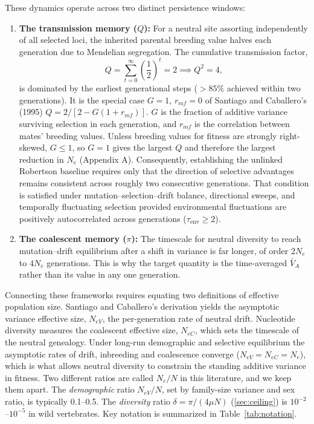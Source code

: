 \documentclass[12pt]{article}
\begin{document}
These dynamics operate across two distinct persistence windows:
\begin{enumerate}
    \item \textbf{The transmission memory ($Q$):} For a neutral site assorting independently of all selected loci, the inherited parental breeding value halves each generation due to Mendelian segregation. The cumulative transmission factor,
    \begin{equation}
    Q = \sum_{t=0}^{\infty} \left(\frac{1}{2}\right)^t = 2 \implies Q^2 = 4,
    \end{equation}
    is dominated by the earliest generational steps ($>85\%$ achieved within two generations). It is the special case $G = 1$, $r_{mf} = 0$ of Santiago and Caballero's (1995) $Q = 2/[2 - G(1+r_{mf})]$. $G$ is the fraction of additive variance surviving selection in each generation, and $r_{mf}$ is the correlation between mates' breeding values. Unless breeding values for fitness are strongly right-skewed, $G \le 1$, so $G = 1$ gives the largest $Q$ and therefore the largest reduction in $N_e$ (Appendix A). Consequently, establishing the unlinked Robertson baseline requires only that the direction of selective advantages remains consistent across roughly two consecutive generations. That condition is satisfied under mutation--selection--drift balance, directional sweeps, and temporally fluctuating selection provided environmental fluctuations are positively autocorrelated across generations ($\tau_{\text{env}} \ge 2$).
    \item \textbf{The coalescent memory ($\pi$):} The timescale for neutral diversity to reach mutation--drift equilibrium after a shift in variance is far longer, of order $2N_e$ to $4N_e$ generations. This is why the target quantity is the time-averaged $\bar{V}_A$ rather than its value in any one generation.
\end{enumerate}

Connecting these frameworks requires equating two definitions of effective population size. Santiago and Caballero's derivation yields the asymptotic variance effective size, $N_{eV}$, the per-generation rate of neutral drift. Nucleotide diversity measures the coalescent effective size, $N_{eC}$, which sets the timescale of the neutral genealogy. Under long-run demographic and selective equilibrium the asymptotic rates of drift, inbreeding and coalescence converge ($N_{eV} = N_{eC} = N_e$), which is what allows neutral diversity to constrain the standing additive variance in fitness. Two different ratios are called $N_e/N$ in this literature, and we keep them apart. The \emph{demographic} ratio $N_{eV}/N$, set by family-size variance and sex ratio, is typically 0.1--0.5. The \emph{diversity} ratio $\delta = \pi/(4\mu N)$ (\autoref{sec:ceiling}) is $10^{-2}$--$10^{-5}$ in wild vertebrates. Key notation is summarized in Table~\ref{tab:notation}.
\end{document}
